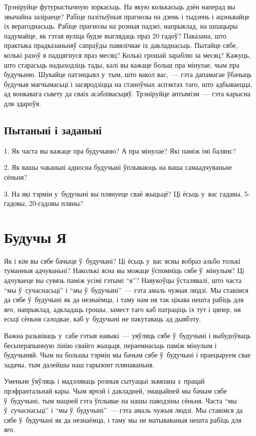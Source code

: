 Трэніруйце футурыстычную зоркасьць. На якую колькасьць дзён наперад вы звычайна зазіраеце? Рабіце пазітыўныя прагнозы на дзень і тыдзень і ацэньвайце іх верагоднасьць. Рабіце прагнозы на розныя падзеі, напрыклад, на шпацыры падумайце, як гэтая вуліца будзе выглядаць праз 20 гадоў? Паказана, што практыка прадказаньняў сапраўды павялічвае іх дакладнасьць. Пытайце сябе, колькі разоў я падцягнуся праз месяц? Колькі грошай зараблю за месяц? Кажуць, што старасьць надыходзіць тады, калі вы кажаце больш пра мінулае, чым пра будучыню. Шукайце патэнцыял у~тым, што вакол вас,~--- гэта дапамагае ўбачыць будучыя магчымасьці і засяродзіцца на станоўчых аспэктах таго, што адбываецца, ад вонкавага сьвету да сваіх асаблівасьцяў. Трэніруйце аптымізм~--- гэта карысна для здароўя.

\subsection*{Пытаньні і заданьні}

1. Як часта вы кажаце пра будучыню? А пра мінулае? Які паміж імі балянс?

2. Як вашы чаканьні адносна будучыні ўплываюць на ваша самаадчуваньне сёньня?

3. На які тэрмін у~будучыні вы плянуеце сваё жыцьцё? Ці ёсьць у~вас гадавы, 5-гадовы, 20-гадовы пляны?


\section{Будучы Я}

Як і кім вы сябе бачыце ў~будучыні? Ці ёсьць у~вас ясны вобраз альбо толькі туманныя адчуваньні? Наколькі ясна вы можаце ўспомніць сябе ў~мінулым? Ці адчуваеце вы сувязь паміж усімі гэтымі ``я''? Навукоўцы ўсталявалі, што часта ``мы ў~сучаснасьці'' і ``мы ў~будучыні''~--- гэта амаль чужыя людзі. Мы ставімся да сябе ў~будучыні як да незнаёмца, і таму нам ня так цікава нешта рабіць для яго, напрыклад, адкладаць грошы, замест таго каб патраціць іх тут і цяпер, ня есьці сёньня салодкае, каб у~будучыні не пакутаваць ад дыябэту.

Важна разьвіваць у~сабе гэтыя навыкі~--- уяўляць сябе ў~будучыні і выбудоўваць бесьперапынную лінію свайго жыцьця, пераемнасьць паміж мінулым і будучыняй. Чым на большы тэрмін мы бачым сябе ў~будучыні і праецыруем свае задачы, тым далейшы наш гарызонт плянаваньня.

Уменьне ўяўляць і мадэляваць розныя сытуацыі зьвязана з~працай прэфрантальнай кары. Чым ярчэй і дакладней, эмацыйней мы бачым сябе ў~будучыні, тым мацней гэта ўплывае на нашы паводзіны сёньня. Часта ``мы ў~сучаснасьці'' і ``мы ў~будучыні''~--- гэта амаль чужыя людзі. Мы ставімся да сябе ў~будучыні як да незнаёмца, і таму мы не матываваныя нешта рабіць для яго.

